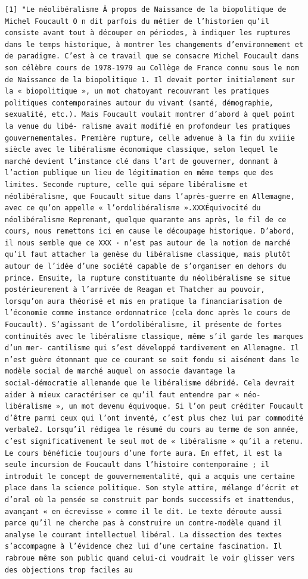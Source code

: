 \documentclass[
  letterpaper,
  DIV=11,
  numbers=noendperiod]{scrreprt}
\begin{document}
\begin{verbatim}
[1] "Le néolibéralisme À propos de Naissance de la biopolitique de Michel Foucault O n dit parfois du métier de l’historien qu’il consiste avant tout à découper en périodes, à indiquer les ruptures dans le temps historique, à montrer les changements d’environnement et de paradigme. C’est à ce travail que se consacre Michel Foucault dans son célèbre cours de 1978‑1979 au Collège de France connu sous le nom de Naissance de la biopolitique 1. Il devait porter initialement sur la « biopolitique », un mot chatoyant recouvrant les pratiques politiques contemporaines autour du vivant (santé, démographie, sexualité, etc.). Mais Foucault voulait montrer d’abord à quel point la venue du libé‑ ralisme avait modifié en profondeur les pratiques gouvernementales. Première rupture, celle advenue à la fin du xviiie siècle avec le libéralisme économique classique, selon lequel le marché devient l’instance clé dans l’art de gouverner, donnant à l’action publique un lieu de légitimation en même temps que des limites. Seconde rupture, celle qui sépare libéralisme et néolibéralisme, que Foucault situe dans l’après‑guerre en Allemagne, avec ce qu’on appelle « l’ordolibéralisme ».XXXÉquivocité du néolibéralisme Reprenant, quelque quarante ans après, le fil de ce cours, nous remettons ici en cause le découpage historique. D’abord, il nous semble que ce XXX · n’est pas autour de la notion de marché qu’il faut attacher la genèse du libéralisme classique, mais plutôt autour de l’idée d’une société capable de s’organiser en dehors du prince. Ensuite, la rupture constituante du néolibéralisme se situe postérieurement à l’arrivée de Reagan et Thatcher au pouvoir, lorsqu’on aura théorisé et mis en pratique la financiarisation de l’économie comme instance ordonnatrice (cela donc après le cours de Foucault). S’agissant de l’ordolibéralisme, il présente de fortes continuités avec le libéralisme classique, même s’il garde les marques d’un mer‑ cantilisme qui s’est développé tardivement en Allemagne. Il n’est guère étonnant que ce courant se soit fondu si aisément dans le modèle social de marché auquel on associe davantage la social‑démocratie allemande que le libéralisme débridé. Cela devrait aider à mieux caractériser ce qu’il faut entendre par « néo‑ libéralisme », un mot devenu équivoque. Si l’on peut créditer Foucault d’être parmi ceux qui l’ont inventé, c’est plus chez lui par commodité verbale2. Lorsqu’il rédigea le résumé du cours au terme de son année, c’est significativement le seul mot de « libéralisme » qu’il a retenu. Le cours bénéficie toujours d’une forte aura. En effet, il est la seule incursion de Foucault dans l’histoire contemporaine ; il introduit le concept de gouvernementalité, qui a acquis une certaine place dans la science politique. Son style attire, mélange d’écrit et d’oral où la pensée se construit par bonds successifs et inattendus, avançant « en écrevisse » comme il le dit. Le texte déroute aussi parce qu’il ne cherche pas à construire un contre‑modèle quand il analyse le courant intellectuel libéral. La dissection des textes s’accompagne à l’évidence chez lui d’une certaine fascination. Il rabroue même son public quand celui‑ci voudrait le voir glisser vers des objections trop faciles au 
\end{verbatim}
\end{document}
